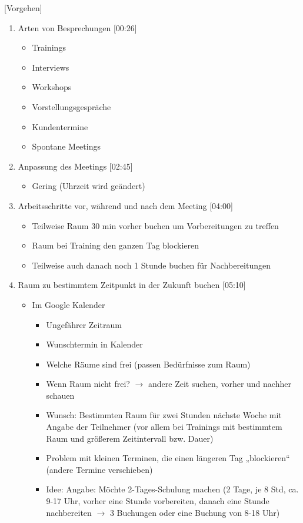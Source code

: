 [Vorgehen]

\begin{enumerate}

    \item Arten von Besprechungen [00:26]
    \begin{itemize}
        \item Trainings
        \item Interviews
        \item Workshops
        \item Vorstellungsgespräche
        \item Kundentermine
        \item Spontane Meetings
    \end{itemize}
    
    \item Anpassung des Meetings [02:45]
    \begin{itemize}
        \item Gering (Uhrzeit wird geändert)
    \end{itemize}
    
    \item Arbeitsschritte vor, während und nach dem Meeting [04:00]
     \begin{itemize}
        \item Teilweise Raum 30 min vorher buchen um Vorbereitungen zu treffen
        \item Raum bei Training den ganzen Tag blockieren
        \item Teilweise auch danach noch 1 Stunde buchen für Nachbereitungen
    \end{itemize}
    
    \item Raum zu bestimmtem Zeitpunkt in der Zukunft buchen [05:10]
     \begin{itemize}
        \item Im Google Kalender
        \begin{itemize}
            \item Ungefährer Zeitraum
            \item Wunschtermin in Kalender
            \item Welche Räume sind frei (passen Bedürfnisse zum Raum)
            \item Wenn Raum nicht frei? $\rightarrow$ andere Zeit suchen, vorher und nachher schauen
            \item Wunsch: Bestimmten Raum für zwei Stunden nächste Woche mit Angabe der Teilnehmer (vor allem bei Trainings mit bestimmtem Raum und größerem Zeitintervall bzw. Dauer)
            \item Problem mit kleinen Terminen, die einen längeren Tag „blockieren“ (andere Termine verschieben)
            \item Idee: Angabe: Möchte 2-Tages-Schulung machen (2 Tage, je 8 Std, ca. 9-17 Uhr, vorher eine Stunde vorbereiten, danach eine Stunde nachbereiten $\rightarrow$ 3 Buchungen oder eine Buchung von 8-18 Uhr)
        \end{itemize}
    \end{itemize}
    

\end{enumerate}
